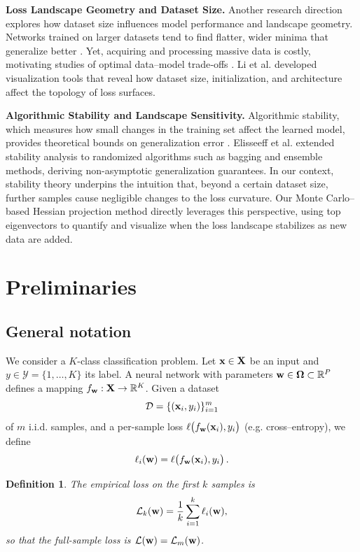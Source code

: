 \documentclass{article}
\newtheorem{definition}{Definition}
\begin{document}
\textbf{Loss Landscape Geometry and Dataset Size.}
Another research direction explores how dataset size influences model performance and landscape geometry. Networks trained on larger
datasets tend to find flatter, wider minima that generalize better \cite{wu2017towards}. Yet, acquiring and processing massive data is
costly, motivating studies of optimal data–model trade‑offs \cite{hoffmann2022training}. Li et al. \cite{li2018visualizing} developed
visualization tools that reveal how dataset size, initialization, and architecture affect the topology of loss surfaces.

\textbf{Algorithmic Stability and Landscape Sensitivity.}
Algorithmic stability, which measures how small changes in the training set affect the learned model, provides theoretical bounds on
generalization error \cite{bousquet2002stability}. Elisseeff et al. \cite{elisseeff2005stability} extended stability analysis to
randomized algorithms such as bagging and ensemble methods, deriving non-asymptotic generalization guarantees. In our context,
stability theory underpins the intuition that, beyond a certain dataset size, further samples cause negligible changes to the loss
curvature. Our Monte Carlo–based Hessian projection method directly leverages this perspective, using top eigenvectors to quantify
and visualize when the loss landscape stabilizes as new data are added.


\section{Preliminaries}\label{sec:prelim}

\subsection{General notation}

We consider a $K$-class classification problem. Let $\mathbf{x} \in \mathbf{X}$ be an input and $y \in \mathcal Y = \{1,\dots,K\}$ its label. A
neural network with parameters $\mathbf{w} \in \boldsymbol{\Omega} \subset \mathbb R^P$ defines a mapping $f_{\mathbf{w}} : \mathbf{X} \to \mathbb R^K$. Given a dataset
$$
  \mathcal D =
  \{(\mathbf{x}_i, y_i)\}_{i=1}^m
$$
of $m$ i.i.d. samples, and a per-sample loss $\ell \bigl( f_{\mathbf{w}}(\mathbf{x}_i), y_i \bigr)$ (e.g. cross–entropy), we define
$$
  \ell_i(\mathbf{w}) =
  \ell \bigl( f_{\mathbf{w}}(\mathbf{x}_i) , y_i \bigr)\,.
$$

\begin{definition}
  The empirical loss on the first $k$ samples is
  $$
    \mathcal{L}_k(\mathbf{w}) =
    \frac1k \sum_{i=1}^k \ell_i(\mathbf{w}),
  $$
  so that the full-sample loss is $\mathcal{L}(\mathbf{w}) = \mathcal{L}_m(\mathbf{w})$.
\end{definition}
\end{document}
